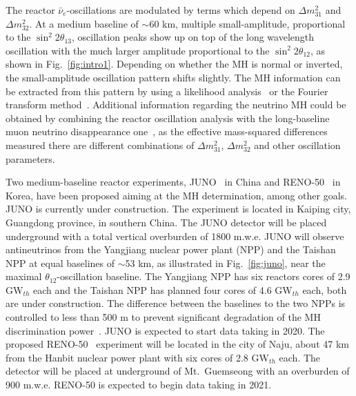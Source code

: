 \documentclass[aps,twocolumn,preprintnumbers,amsmath,superscriptaddress,amssymb,floats,nofootinbib]{revtex4-1}
\begin{document}
The reactor $\bar\nu_e$-oscillations are modulated by terms which depend on $\Delta m^2_{31}$ and $\Delta m^2_{32}$.
At a medium baseline of $\sim$60 km, multiple small-amplitude, proportional to the $\sin^2 2 \theta_{13}$, oscillation peaks show up 
on top of the long wavelength oscillation with the much larger amplitude proportional to the $\sin^2 2 \theta_{12}$, as shown in Fig.~\ref{fig:intro1}.
Depending on whether the MH is normal or inverted, the small-amplitude oscillation pattern shifts slightly.
The MH information can be extracted from this pattern by using a likelihood analysis~\cite{Li-PRD13} or the Fourier transform method~\cite{Zhan-PRD08,Zhan-PRD09}.
Additional information regarding the neutrino MH could be obtained by combining the reactor oscillation analysis with the long-baseline muon neutrino disappearance one~\cite{Minakata}, 
as the effective mass-squared differences measured there are different combinations of $\Delta m^2_{31}$, $\Delta m^2_{32}$ and other oscillation parameters.

Two medium-baseline reactor experiments, JUNO~\cite{He-Now2014} in China and RENO-50~\cite{RENO-50} in Korea, have been proposed aiming at the MH determination, among other goals. JUNO is currently under construction.
The experiment is located in Kaiping city, Guangdong province, in southern China.
The JUNO detector will be placed underground with a total vertical overburden of 1800 m.w.e. JUNO will observe antineutrinos from the Yangjiang nuclear power plant (NPP) and the Taishan NPP at equal baselines of $\sim$53 km, as illustrated in Fig.~\ref{fig:juno}, near the maximal $\theta_{12}$-oscillation baseline. The Yangjiang NPP has six reactors cores of 2.9 GW$_{th}$ each and the Taishan NPP has planned four cores of 4.6 GW$_{th}$ each, both are under construction. The difference between the baselines to the two NPPs is controlled to less than 500 m to prevent significant degradation of the MH discrimination power~\cite{Li-PRD13}. JUNO is expected to start data taking in 2020. The proposed RENO-50~\cite{RENO-50} experiment will be located in the city of Naju, about 47 km from the Hanbit nuclear power plant with six cores of 2.8 GW$_{th}$ each. The detector will be placed at underground of Mt.~Guemseong with an overburden of 900 m.w.e. RENO-50 is expected to begin data taking in 2021. 
\end{document}
